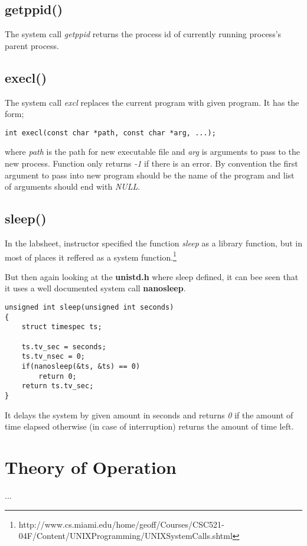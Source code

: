\documentclass[11pt]{article}
\begin{document}
\subsection*{getppid()}
The system call \textit{getppid} returns the process id of currently running process's parent process.

\subsection*{execl()}
The system call \textit{excl} replaces the current program with given program. It has the form;

\begin{lstlisting}[frame=tlrb]
int execl(const char *path, const char *arg, ...);
\end{lstlisting}

where \textit{path} is the path for new executable file and \textit{arg} is arguments to pass to the new process. Function only returns \textit{-1} if there is an error. By convention the first argument to pass into new program should be the name of the program and list of arguments should end with \textit{NULL}.

\subsection*{sleep()}
In the labsheet, instructor specified the function \textit{sleep} as a library function, but in most of places it reffered as a system function.\footnote{http://www.cs.miami.edu/home/geoff/Courses/CSC521-04F/Content/UNIXProgramming/UNIXSystemCalls.shtml}

But then again looking at the \textbf{unistd.h} where sleep defined, it can bee seen that it uses a well documented system call \textbf{nanosleep}.

\begin{lstlisting}[frame=tlrb]
unsigned int sleep(unsigned int seconds)
{
	struct timespec ts;
	
	ts.tv_sec = seconds;
	ts.tv_nsec = 0;
	if(nanosleep(&ts, &ts) == 0)
		return 0;
	return ts.tv_sec;
}
\end{lstlisting}

It delays the system by given amount in seconds and returns \textit{0} if the amount of time elapsed otherwise (in case of interruption) returns the amount of time left.

\section*{Theory of Operation}
...
\end{document}
